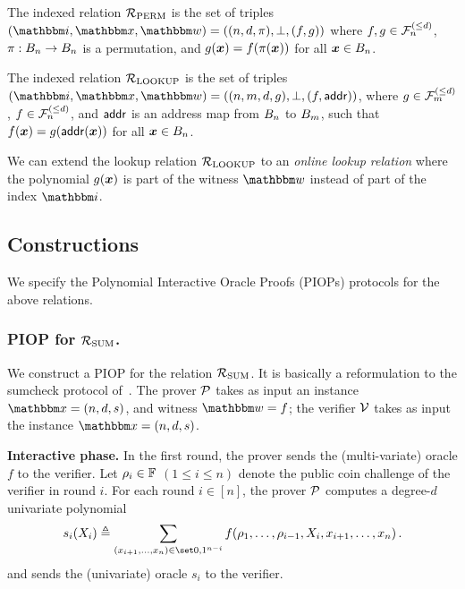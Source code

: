 \begin{definition}
    The indexed relation ${\mathcal{R}}_{\text{PERM}}$ is the set of triples $(\idxR, \instR, \witR)=
    ((n, d, \perm), \bot, (f, g))$ where $f, g \in {\mathcal{F}}_{n}^{(\le{d})}$, $\pi : B_{n} \rightarrow B_{n}$
    is a permutation, and $g(\boldsymbol{x}) = f(\pi(\boldsymbol{x}))$ for all $\boldsymbol{x} \in B_{n}$.
\end{definition}

\begin{definition}
    The indexed relation ${\mathcal{R}}_{\text{LOOKUP}}$ is the set of triples $(\idxR, \instR, \witR)=
    ((n, m, d, g), \bot, (f, \addr))$, where $g \in {\mathcal{F}}_{m}^{(\le{d})}$, $f \in {\mathcal{F}}_{n}^{(\le{d})}$,
    and $\mathsf{addr}$ is an address map from $B_{n}$ to $B_{m}$, such that 
    $f(\boldsymbol{x}) = g(\mathsf{addr}(\boldsymbol{x}))$ for all $\boldsymbol{x} \in B_{n}$.
\end{definition}

\begin{remark}
    We can extend the lookup relation ${\mathcal{R}}_{\text{LOOKUP}}$ to an \emph{online lookup relation}
    where the polynomial $g(\boldsymbol{x})$ is part of the witness $\witR$ 
    instead of part of the index $\idxR$.
\end{remark}

\subsection{Constructions}
We specify the Polynomial Interactive Oracle Proofs (PIOPs) protocols for the above relations.

\subsubsection*{PIOP for ${\mathcal{R}}_{\text{SUM}}$.} We construct a PIOP for 
the relation ${\mathcal{R}}_{\text{SUM}}$. It is basically a reformulation to the sumcheck protocol
of~\cite{LFKN92}.
The prover $\mathcal{P}$ takes as input an instance $\instR = (n, d, s)$,
and witness $\witR = f$; the verifier $\mathcal{V}$ takes as input the 
instance $\instR = (n, d, s)$.

\textbf{Interactive phase.} 
In the first round, the prover sends the (multi-variate) oracle $f$ to the verifier.
Let $\rho_{i} \in \mathbb{F}$ $(1 \le i \le n)$ denote the public coin challenge
of the verifier in round $i$.
For each round $i \in [n]$, the prover $\mathcal{P}$ computes a 
degree-$d$ univariate polynomial
\[
      s_i(X_i) \deq 
      \sum_{ (x_{i+1}, \dots, x_{n}) \in \zo^{n-i} } 
      f(\chal{1}, \dots, \chal{i-1}, X_i, x_{i+1}, \dots, x_n) \,.
\]
and sends the (univariate) oracle $s_i$ to the verifier.

